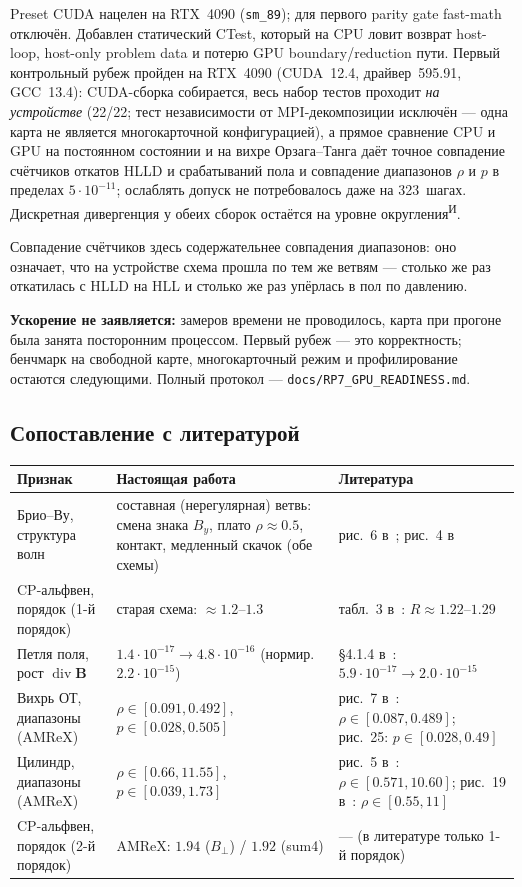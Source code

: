 \documentclass[12pt,a4paper]{article}
\newcommand{\divg}{\operatorname{div}}
\newcommand{\B}{\mathbf{B}}
\newcommand{\code}[1]{\texttt{#1}}
\newcommand{\Iz}{\textsuperscript{\scriptsize И}}    %
\begin{document}
Preset CUDA нацелен на RTX~4090 (\code{sm\_89}); для первого parity gate
fast-math отключён. Добавлен статический CTest, который на CPU ловит возврат
host-loop, host-only problem data и потерю GPU boundary/reduction пути.
Первый контрольный рубеж пройден на RTX~4090 (CUDA~12.4, драйвер~595.91,
GCC~13.4): CUDA-сборка собирается, весь набор тестов проходит \emph{на
устройстве} (22/22; тест независимости от MPI-декомпозиции исключён --- одна
карта не является многокарточной конфигурацией), а прямое сравнение CPU и GPU
на постоянном состоянии и на вихре Орзага--Танга даёт точное совпадение
счётчиков откатов HLLD и срабатываний пола и совпадение диапазонов $\rho$ и
$p$ в пределах $5\!\cdot\!10^{-11}$; ослаблять допуск не потребовалось даже на
323~шагах. Дискретная дивергенция у обеих сборок остаётся на уровне
округления\Iz.

Совпадение счётчиков здесь содержательнее совпадения диапазонов: оно означает,
что на устройстве схема прошла по тем же ветвям --- столько же раз откатилась с
HLLD на HLL и столько же раз упёрлась в пол по давлению.

\textbf{Ускорение не заявляется:} замеров времени не проводилось, карта при
прогоне была занята посторонним процессом. Первый рубеж --- это корректность;
бенчмарк на свободной карте, многокарточный режим и профилирование остаются
следующими. Полный протокол --- \code{docs/RP7\_GPU\_READINESS.md}.

\subsection{Сопоставление с литературой}
\label{sec:res-lit}

\begin{center}\footnotesize
\begin{tabular}{p{3.4cm}p{5.6cm}p{5.6cm}}
\toprule
Признак & Настоящая работа & Литература \\
\midrule
Брио--Ву, структура волн & составная (нерегулярная) ветвь: смена знака $B_y$,
плато $\rho\approx0.5$, контакт, медленный скачок
(обе схемы) & рис.~6 в~\cite{shamanov2025};
рис.~4 в~\cite{avdeeva2019} \\
CP-альфвен, порядок (1-й порядок) & старая схема:
$\approx1.2\text{--}1.3$ & табл.~3 в~\cite{shamanov2025}:
$R\approx1.22\text{--}1.29$ \\
Петля поля, рост $\divg\B$ & $1.4\!\cdot\!10^{-17}\to4.8\!\cdot\!10^{-16}$
(нормир.\ $2.2\!\cdot\!10^{-15}$) & \S4.1.4 в~\cite{shamanov2025}:
$5.9\!\cdot\!10^{-17}\to2.0\!\cdot\!10^{-15}$ \\
Вихрь ОТ, диапазоны (AMReX) & $\rho\in[0.091,0.492]$, $p\in[0.028,0.505]$
& рис.~7 в~\cite{avdeeva2019}: $\rho\in[0.087,0.489]$; рис.~25:
$p\in[0.028,0.49]$ \\
Цилиндр, диапазоны (AMReX) & $\rho\in[0.66,11.55]$, $p\in[0.039,1.73]$ &
рис.~5 в~\cite{avdeeva2019}: $\rho\in[0.571,10.60]$; рис.~19
в~\cite{shamanov2025}: $\rho\in[0.55,11]$ \\
CP-альфвен, порядок (2-й порядок) & AMReX: $1.94$ ($B_\perp$) / $1.92$ (sum4) & --- (в литературе только
1-й порядок) \\
\bottomrule
\end{tabular}
\end{center}
\end{document}
